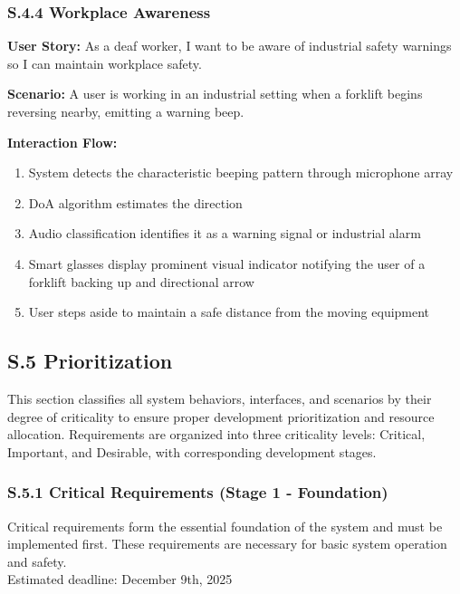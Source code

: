 \documentclass[12pt]{article}
\theoremstyle{definition}
\begin{document}
\subsubsection{S.4.4 Workplace Awareness}
\textbf{User Story:} As a deaf worker, I want to be aware of industrial safety warnings so I can maintain workplace safety.

\textbf{Scenario:} A user is working in an industrial setting when a forklift begins reversing nearby, emitting a warning beep.

\textbf{Interaction Flow:}
\begin{enumerate}
    \item System detects the characteristic beeping pattern through microphone array
    \item DoA algorithm estimates the direction
    \item Audio classification identifies it as a warning signal or industrial alarm
    \item Smart glasses display prominent visual indicator notifying the user of a forklift backing up and directional arrow
    \item User steps aside to maintain a safe distance from the moving equipment
\end{enumerate}

\subsection{S.5 Prioritization}

This section classifies all system behaviors, interfaces, and scenarios by their degree of criticality to ensure proper development prioritization and resource allocation. Requirements are organized into three criticality levels: Critical, Important, and Desirable, with corresponding development stages.

\subsubsection{S.5.1 Critical Requirements (Stage 1 - Foundation)}

Critical requirements form the essential foundation of the system and must be
implemented first. These requirements are necessary for basic system operation
and safety. \\
\newline
Estimated deadline: December 9th, 2025 \\
\newline
\end{document}
